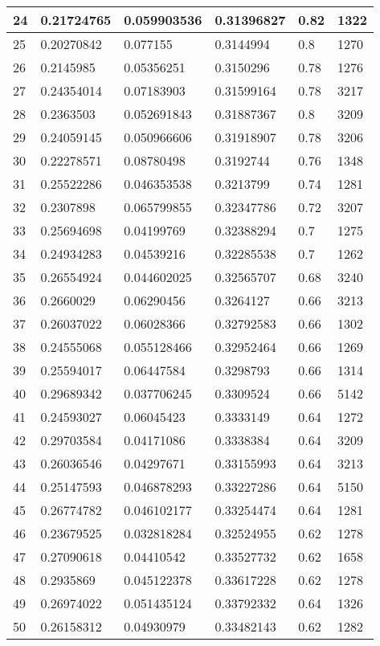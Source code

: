 \begin{longtable}{|l|l|l|l|l|l|}
24 & 0.21724765 & 0.059903536 & 0.31396827 & 0.82 & 1322 \\ \hline 
25 & 0.20270842 & 0.077155 & 0.3144994 & 0.8 & 1270 \\ \hline 
26 & 0.2145985 & 0.05356251 & 0.3150296 & 0.78 & 1276 \\ \hline 
27 & 0.24354014 & 0.07183903 & 0.31599164 & 0.78 & 3217 \\ \hline 
28 & 0.2363503 & 0.052691843 & 0.31887367 & 0.8 & 3209 \\ \hline 
29 & 0.24059145 & 0.050966606 & 0.31918907 & 0.78 & 3206 \\ \hline 
30 & 0.22278571 & 0.08780498 & 0.3192744 & 0.76 & 1348 \\ \hline 
31 & 0.25522286 & 0.046353538 & 0.3213799 & 0.74 & 1281 \\ \hline 
32 & 0.2307898 & 0.065799855 & 0.32347786 & 0.72 & 3207 \\ \hline 
33 & 0.25694698 & 0.04199769 & 0.32388294 & 0.7 & 1275 \\ \hline 
34 & 0.24934283 & 0.04539216 & 0.32285538 & 0.7 & 1262 \\ \hline 
35 & 0.26554924 & 0.044602025 & 0.32565707 & 0.68 & 3240 \\ \hline 
36 & 0.2660029 & 0.06290456 & 0.3264127 & 0.66 & 3213 \\ \hline 
37 & 0.26037022 & 0.06028366 & 0.32792583 & 0.66 & 1302 \\ \hline 
38 & 0.24555068 & 0.055128466 & 0.32952464 & 0.66 & 1269 \\ \hline 
39 & 0.25594017 & 0.06447584 & 0.3298793 & 0.66 & 1314 \\ \hline 
40 & 0.29689342 & 0.037706245 & 0.3309524 & 0.66 & 5142 \\ \hline 
41 & 0.24593027 & 0.06045423 & 0.3333149 & 0.64 & 1272 \\ \hline 
42 & 0.29703584 & 0.04171086 & 0.3338384 & 0.64 & 3209 \\ \hline 
43 & 0.26036546 & 0.04297671 & 0.33155993 & 0.64 & 3213 \\ \hline 
44 & 0.25147593 & 0.046878293 & 0.33227286 & 0.64 & 5150 \\ \hline 
45 & 0.26774782 & 0.046102177 & 0.33254474 & 0.64 & 1281 \\ \hline 
46 & 0.23679525 & 0.032818284 & 0.32524955 & 0.62 & 1278 \\ \hline 
47 & 0.27090618 & 0.04410542 & 0.33527732 & 0.62 & 1658 \\ \hline 
48 & 0.2935869 & 0.045122378 & 0.33617228 & 0.62 & 1278 \\ \hline 
49 & 0.26974022 & 0.051435124 & 0.33792332 & 0.64 & 1326 \\ \hline 
50 & 0.26158312 & 0.04930979 & 0.33482143 & 0.62 & 1282 \\ \hline 
\end{longtable}